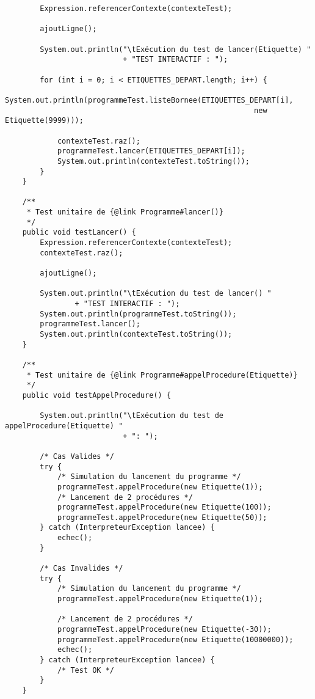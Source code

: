 \begin{enum}
\begin{verbatim}
        Expression.referencerContexte(contexteTest);
        
        ajoutLigne();
        
        System.out.println("\tExécution du test de lancer(Etiquette) "
                           + "TEST INTERACTIF : ");

        for (int i = 0; i < ETIQUETTES_DEPART.length; i++) {
            System.out.println(programmeTest.listeBornee(ETIQUETTES_DEPART[i], 
                                                         new Etiquette(9999)));

            contexteTest.raz();
            programmeTest.lancer(ETIQUETTES_DEPART[i]);
            System.out.println(contexteTest.toString());
        }
    }
    
    /** 
     * Test unitaire de {@link Programme#lancer()}
     */
    public void testLancer() {
        Expression.referencerContexte(contexteTest);
        contexteTest.raz();
        
        ajoutLigne();
        
        System.out.println("\tExécution du test de lancer() "
                + "TEST INTERACTIF : ");
        System.out.println(programmeTest.toString());
        programmeTest.lancer();
        System.out.println(contexteTest.toString());
    }
    
    /** 
     * Test unitaire de {@link Programme#appelProcedure(Etiquette)}
     */
    public void testAppelProcedure() {
        
        System.out.println("\tExécution du test de appelProcedure(Etiquette) "
                           + ": ");
        
        /* Cas Valides */
        try {
            /* Simulation du lancement du programme */
            programmeTest.appelProcedure(new Etiquette(1));
            /* Lancement de 2 procédures */
            programmeTest.appelProcedure(new Etiquette(100));
            programmeTest.appelProcedure(new Etiquette(50));
        } catch (InterpreteurException lancee) {
            echec();
        }
        
        /* Cas Invalides */
        try {
            /* Simulation du lancement du programme */
            programmeTest.appelProcedure(new Etiquette(1));
            
            /* Lancement de 2 procédures */
            programmeTest.appelProcedure(new Etiquette(-30));
            programmeTest.appelProcedure(new Etiquette(10000000));
            echec();
        } catch (InterpreteurException lancee) {
            /* Test OK */
        }
    }
    

\end{verbatim}
\end{enum}
